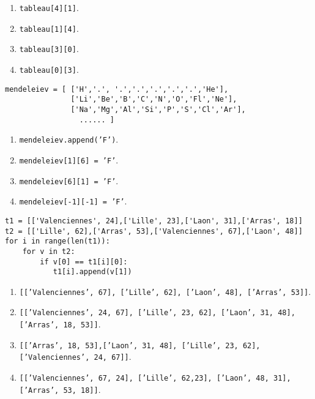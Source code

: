 \begin{enumerate}
\item \texttt{tableau[4][1]}.
\item \texttt{tableau[1][4]}.
\item \texttt{tableau[3][0]}. %
\item \texttt{tableau[0][3]}.
\end{enumerate}

\begin{lstlisting}
mendeleiev = [ ['H','.', '.','.','.','.','.','He'],
               ['Li','Be','B','C','N','O','Fl','Ne'],
               ['Na','Mg','Al','Si','P','S','Cl','Ar'],
                 ...... ]
\end{lstlisting}
\begin{enumerate}
\item \texttt{mendeleiev.append('F')}.
\item \texttt{mendeleiev[1][6] = 'F'}. %
\item \texttt{mendeleiev[6][1] = 'F'}.
\item \texttt{mendeleiev[-1][-1] = 'F'}.
\end{enumerate}

\begin{lstlisting}
t1 = [['Valenciennes', 24],['Lille', 23],['Laon', 31],['Arras', 18]]
t2 = [['Lille', 62],['Arras', 53],['Valenciennes', 67],['Laon', 48]]
for i in range(len(t1)):
    for v in t2:
        if v[0] == t1[i][0]:
           t1[i].append(v[1])
\end{lstlisting}
\begin{enumerate}
\item \texttt{[['Valenciennes', 67], ['Lille', 62], ['Laon', 48], ['Arras', 53]]}.
\item \texttt{[['Valenciennes', 24, 67], ['Lille', 23, 62], ['Laon', 31, 48], ['Arras', 18, 53]]}. %
\item \texttt{[['Arras', 18, 53],['Laon', 31, 48], ['Lille', 23, 62], ['Valenciennes', 24, 67]]}.
\item \texttt{[['Valenciennes', 67, 24], ['Lille', 62,23], ['Laon', 48, 31], ['Arras', 53, 18]]}.
\end{enumerate}


